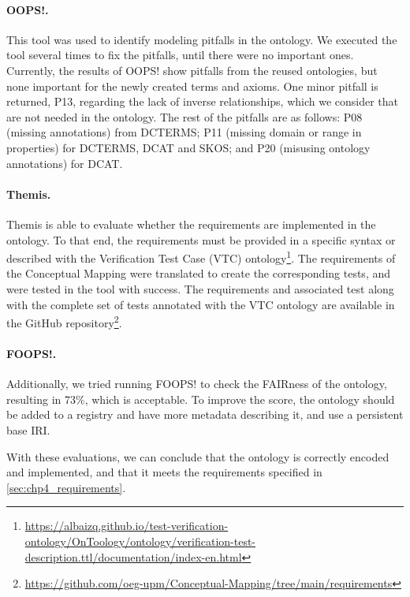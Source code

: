 \noindent\paragraph{\textbf{OOPS!.}} This tool was used to identify modeling pitfalls in the ontology. We executed the tool several times to fix the pitfalls, until there were no important ones. Currently, the results of OOPS! show pitfalls from the reused ontologies, but none important for the newly created terms and axioms. One minor pitfall is returned, P13, regarding the lack of inverse relationships, which we consider that are not  needed in the ontology. The rest of the pitfalls are as follows: P08 (missing annotations) from DCTERMS; P11 (missing domain or range in properties) for DCTERMS, DCAT and SKOS; and P20 (misusing ontology annotations) for DCAT.

\noindent\paragraph{\textbf{Themis.}} Themis is able to evaluate whether the requirements are implemented in the ontology. To that end, the requirements must be provided in a specific syntax or described with the Verification Test Case (VTC) ontology\footnote{\url{https://albaizq.github.io/test-verification-ontology/OnToology/ontology/verification-test-description.ttl/documentation/index-en.html}}. The requirements of the Conceptual Mapping were translated to create the corresponding tests, and were tested in the tool with success. The requirements and associated test along with the complete set of tests annotated with the VTC ontology are available in the GitHub repository\footnote{\url{https://github.com/oeg-upm/Conceptual-Mapping/tree/main/requirements}}.

\noindent\paragraph{\textbf{FOOPS!.}} Additionally, we tried running FOOPS! to check the FAIRness of the ontology, resulting in 73\%, which is acceptable. To improve the score, the ontology should be added to a registry and have more metadata describing it, and use a persistent base IRI. 

With these evaluations, we can conclude that the ontology is correctly encoded and implemented, and that it meets the requirements specified in \cref{sec:chp4_requirements}. 

